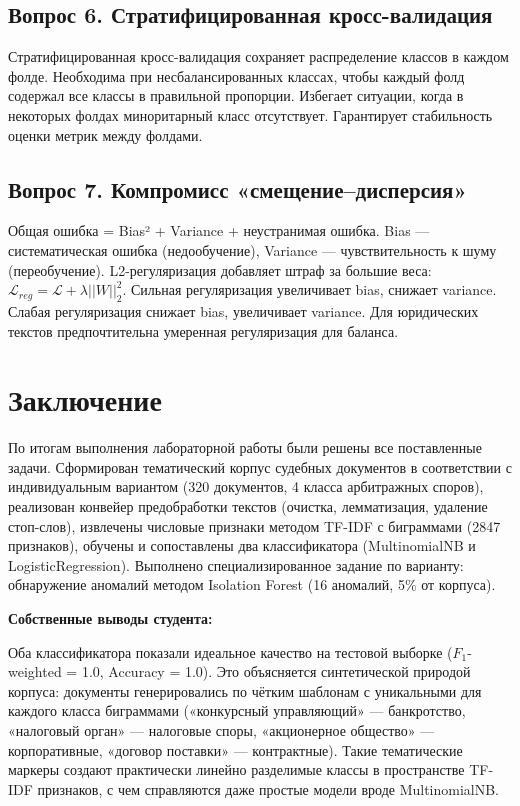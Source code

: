 \documentclass[12pt, a4paper]{report}
\begin{document}
\section{Вопрос 6. Стратифицированная кросс-валидация}

Стратифицированная кросс-валидация сохраняет распределение классов в каждом фолде.
Необходима при несбалансированных классах, чтобы каждый фолд содержал все классы
в правильной пропорции. Избегает ситуации, когда в некоторых фолдах миноритарный
класс отсутствует. Гарантирует стабильность оценки метрик между фолдами.

\section{Вопрос 7. Компромисс «смещение–дисперсия»}

Общая ошибка = Bias² + Variance + неустранимая ошибка. Bias — систематическая
ошибка (недообучение), Variance — чувствительность к шуму (переобучение).
L2-регуляризация добавляет штраф за большие веса: $\mathcal{L}_{reg} = \mathcal{L} + \lambda||W||_2^2$.
Сильная регуляризация увеличивает bias, снижает variance. Слабая регуляризация
снижает bias, увеличивает variance. Для юридических текстов предпочтительна
умеренная регуляризация для баланса.

\chapter{Заключение}

По итогам выполнения лабораторной работы были решены все поставленные задачи.
Сформирован тематический корпус судебных документов в соответствии с индивидуальным
вариантом (320 документов, 4 класса арбитражных споров), реализован конвейер
предобработки текстов (очистка, лемматизация, удаление стоп-слов), извлечены
числовые признаки методом TF-IDF с биграммами (2847 признаков), обучены и
сопоставлены два классификатора (MultinomialNB и LogisticRegression).
Выполнено специализированное задание по варианту: обнаружение аномалий методом
Isolation Forest (16 аномалий, 5\% от корпуса).

\textbf{Собственные выводы студента:}

Оба классификатора показали идеальное качество на тестовой выборке ($F_1$-weighted = 1.0,
Accuracy = 1.0). Это объясняется синтетической природой корпуса: документы
генерировались по чётким шаблонам с уникальными для каждого класса биграммами
(«конкурсный управляющий» — банкротство, «налоговый орган» — налоговые споры,
«акционерное общество» — корпоративные, «договор поставки» — контрактные).
Такие тематические маркеры создают практически линейно разделимые классы в
пространстве TF-IDF признаков, с чем справляются даже простые модели вроде
MultinomialNB.
\end{document}
